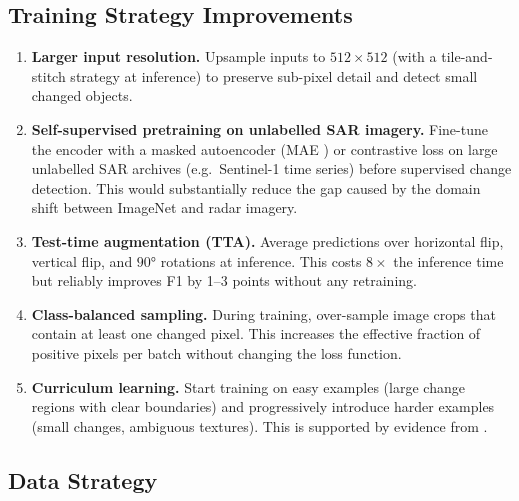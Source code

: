 \documentclass[12pt,a4paper]{article}
\begin{document}
\subsection{Training Strategy Improvements}

\begin{enumerate}[leftmargin=*]
  \item \textbf{Larger input resolution.}  Upsample inputs to $512\times512$ (with a
    tile-and-stitch strategy at inference) to preserve sub-pixel detail and detect small
    changed objects.

  \item \textbf{Self-supervised pretraining on unlabelled SAR imagery.}  Fine-tune the
    encoder with a masked autoencoder (MAE \citep{he2022mae}) or contrastive loss on
    large unlabelled SAR archives (e.g.\ Sentinel-1 time series) before supervised
    change detection.  This would substantially reduce the gap caused by the domain shift
    between ImageNet and radar imagery.

  \item \textbf{Test-time augmentation (TTA).}  Average predictions over horizontal flip,
    vertical flip, and $90°$ rotations at inference.  This costs $8\times$ the inference
    time but reliably improves F1 by 1--3 points without any retraining.

  \item \textbf{Class-balanced sampling.}  During training, over-sample image crops that
    contain at least one changed pixel.  This increases the effective fraction of positive
    pixels per batch without changing the loss function.

  \item \textbf{Curriculum learning.}  Start training on easy examples (large change
    regions with clear boundaries) and progressively introduce harder examples (small
    changes, ambiguous textures).  This is supported by evidence from \citet{bengio2009curriculum}.
\end{enumerate}

\subsection{Data Strategy}
\end{document}
